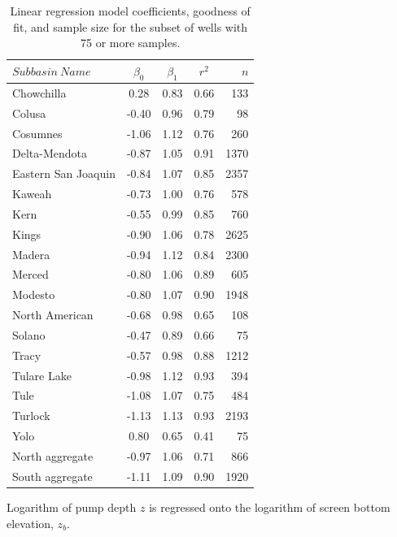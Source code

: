 \begin{table}[ht]
	\centering\footnotesize
	\caption{Linear regression model coefficients, goodness of fit, and sample size for the subset of wells with 75 or more samples.}
	\label{tab:linear_mod_coef}
	\begin{threeparttable}
		
		\begin{tabular}{lcccr}
			\hline
			\hline
			$Subbasin \: Name$ & $\beta_0$ & $\beta_1$ & $r^2$ & $n$ \\
			\hline
			Chowchilla & 0.28 & 0.83 & 0.66 & 133 \\ 
			Colusa & -0.40 & 0.96 & 0.79 &  98 \\ 
			Cosumnes & -1.06 & 1.12 & 0.76 & 260 \\ 
			Delta-Mendota & -0.87 & 1.05 & 0.91 & 1370 \\ 
			Eastern San Joaquin & -0.84 & 1.07 & 0.85 & 2357 \\ 
			Kaweah & -0.73 & 1.00 & 0.76 & 578 \\ 
			Kern & -0.55 & 0.99 & 0.85 & 760 \\ 
			Kings & -0.90 & 1.06 & 0.78 & 2625 \\ 
			Madera & -0.94 & 1.12 & 0.84 & 2300 \\ 
			Merced & -0.80 & 1.06 & 0.89 & 605 \\ 
			Modesto & -0.80 & 1.07 & 0.90 & 1948 \\ 
			North American & -0.68 & 0.98 & 0.65 & 108 \\ 
			Solano & -0.47 & 0.89 & 0.66 &  75 \\ 
			Tracy & -0.57 & 0.98 & 0.88 & 1212 \\ 
			Tulare Lake & -0.98 & 1.12 & 0.93 & 394 \\ 
			Tule & -1.08 & 1.07 & 0.75 & 484 \\ 
			Turlock & -1.13 & 1.13 & 0.93 & 2193 \\ 
			Yolo & 0.80 & 0.65 & 0.41 &  75 \\ 
			North aggregate & -0.97 & 1.06 & 0.71 & 866 \\ 
			South aggregate & -1.11 & 1.09 & 0.90 & 1920 \\ 
			\hline
		\end{tabular}
		
		\begin{tablenotes} 
			Logarithm of pump depth $z$ is regressed onto the logarithm of screen bottom elevation, $z_{b}$.
		\end{tablenotes}
	\end{threeparttable}
	
\end{table}



